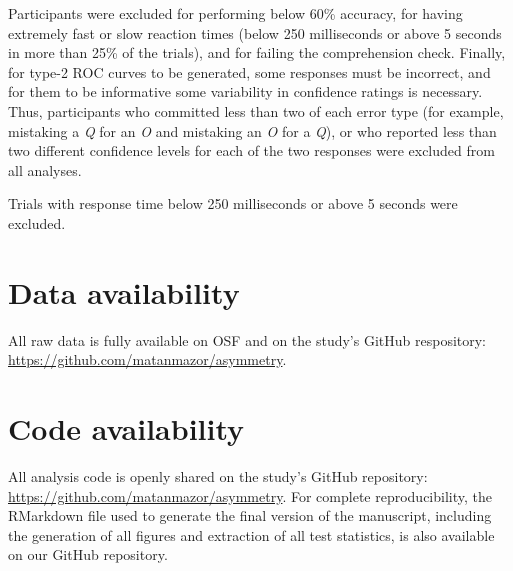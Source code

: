\documentclass[12pt,twoside]{reedthesis}
\begin{document}
Participants were excluded for performing below 60\% accuracy, for having extremely fast or slow reaction times (below 250 milliseconds or above 5 seconds in more than 25\% of the trials), and for failing the comprehension check. Finally, for type-2 ROC curves to be generated, some responses must be incorrect, and for them to be informative some variability in confidence ratings is necessary. Thus, participants who committed less than two of each error type (for example, mistaking a \emph{Q} for an \emph{O} and mistaking an \emph{O} for a \emph{Q}), or who reported less than two different confidence levels for each of the two responses were excluded from all analyses.

Trials with response time below 250 milliseconds or above 5 seconds were excluded.

\hypertarget{data-availability}{%
\section{Data availability}\label{data-availability}}

All raw data is fully available on OSF and on the study's GitHub respository: \url{https://github.com/matanmazor/asymmetry}.

\hypertarget{code-availability}{%
\section{Code availability}\label{code-availability}}

All analysis code is openly shared on the study's GitHub repository: \url{https://github.com/matanmazor/asymmetry}. For complete reproducibility, the RMarkdown file used to generate the final version of the manuscript, including the generation of all figures and extraction of all test statistics, is also available on our GitHub repository.
\end{document}
